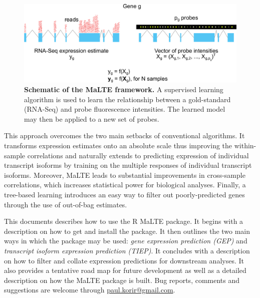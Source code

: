 \documentclass[a4paper,12pt]{article}
\begin{document}
\begin{figure}[H]
\centering
\includegraphics[width=\columnwidth]{schematic.pdf}
\caption{\textbf{Schematic of the MaLTE framework.} A supervised learning algorithm is used to learn the relationship between a gold-standard (RNA-Seq) and probe fluorescence intensities. The learned model may then be applied to a new set of probes.}
\label{fig:schematic}
\end{figure}

This approach overcomes the two main setbacks of conventional algorithms. It transforms expression estimates onto an absolute scale thus improving the within-sample correlations and naturally extends to predicting expression of individual transcript isoforms by training on the multiple responses of individual transcript isoforms. Moreover, \textsf{MaLTE} leads to substantial improvements in cross-sample correlations, which increases statistical power for biological analyses. Finally, a tree-based learning introduces an easy way to filter out poorly-predicted genes through the use of out-of-bag estimates.

This documents describes how to use the \textsf{R} \textsf{MaLTE} package. It begins with a description on how to get and install the package. It then outlines the two main ways in which the package may be used: \textit{gene expression prediction (GEP)} and \textit{transcript isoform expression prediction (TIEP)}. It concludes with a description on how to filter and collate expression predictions for downstream analyses. It also provides a tentative road map for future development as well as a detailed description on how the \textsf{MaLTE} package is built. Bug reports, comments and suggestions are welcome through \href{mailto:paul.korir@gmail.com}{paul.korir@gmail.com}.
\end{document}
